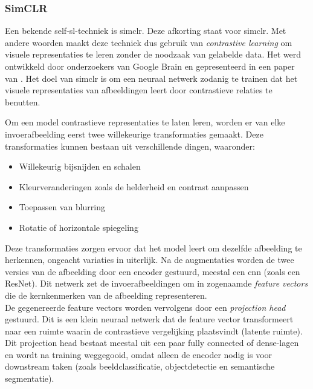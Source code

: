 \subsubsection{SimCLR}

Een bekende \gls{self-sl}-techniek is \acrshort{simclr}. Deze afkorting staat voor \acrlong{simclr}. Met andere woorden maakt deze techniek dus gebruik van \emph{contrastive learning} om visuele representaties te leren zonder de noodzaak van gelabelde data. Het werd ontwikkeld door onderzoekers van Google Brain en gepresenteerd in een paper van \textcite{Chen_2020}. Het doel van \gls{simclr} is om een neuraal netwerk zodanig te trainen dat het visuele representaties van afbeeldingen leert door contrastieve relaties te benutten.

Om een model contrastieve representaties te laten leren, worden er van elke invoerafbeelding eerst twee willekeurige transformaties gemaakt. Deze transformaties kunnen bestaan uit verschillende dingen, waaronder:

\begin{itemize}
    \item Willekeurig bijsnijden en schalen
    \item Kleurveranderingen zoals de helderheid en contrast aanpassen
    \item Toepassen van blurring
    \item Rotatie of horizontale spiegeling
\end{itemize}

Deze transformaties zorgen ervoor dat het model leert om dezelfde afbeelding te herkennen, ongeacht variaties in uiterlijk. Na de augmentaties worden de twee versies van de afbeelding door een encoder gestuurd, meestal een \gls{cnn} (zoals een ResNet). Dit netwerk zet de invoerafbeeldingen om in zogenaamde \emph{feature vectors} die de kernkenmerken van de afbeelding representeren. \\

De gegenereerde feature vectors worden vervolgens door een \emph{projection head} gestuurd. Dit is een klein neuraal netwerk dat de feature vector transformeert naar een ruimte waarin de contrastieve vergelijking plaatsvindt (latente ruimte). Dit projection head bestaat meestal uit een paar  fully connected of dense-lagen en wordt na training weggegooid, omdat alleen de encoder nodig is voor downstream taken (zoals beeldclassificatie, objectdetectie en semantische segmentatie). \autocite{Gupta_2022} \\

